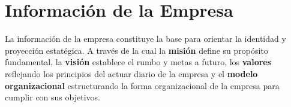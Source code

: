 \cleardoublepage 
{}
\section*{Información de la Empresa}
La información de la empresa constituye la base para orientar la identidad y proyección estatégica. A través de la cual la \textbf{misión} define su propósito fundamental, la \textbf{visión} establece el rumbo y metas a futuro, los \textbf{valores} reflejando los principios del actuar diario de la empresa y el \textbf{modelo organizacional} estructurando la forma organizacional de la empresa para cumplir con sus objetivos.







